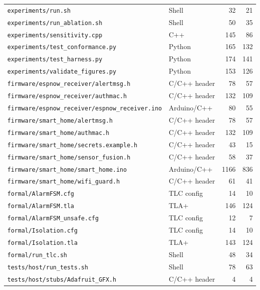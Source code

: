 \begin{longtable}{p{} l r r}
\texttt{\footnotesize experiments/run.sh} & Shell & 32 & 21 \\
\texttt{\footnotesize experiments/run\_ablation.sh} & Shell & 50 & 35 \\
\texttt{\footnotesize experiments/sensitivity.cpp} & C++ & 145 & 86 \\
\texttt{\footnotesize experiments/test\_conformance.py} & Python & 165 & 132 \\
\texttt{\footnotesize experiments/test\_harness.py} & Python & 174 & 141 \\
\texttt{\footnotesize experiments/validate\_figures.py} & Python & 153 & 126 \\
\texttt{\footnotesize firmware/espnow\_receiver/alertmsg.h} & C/C++ header & 78 & 57 \\
\texttt{\footnotesize firmware/espnow\_receiver/authmac.h} & C/C++ header & 132 & 109 \\
\texttt{\footnotesize firmware/espnow\_receiver/espnow\_receiver.ino} & Arduino/C++ & 80 & 55 \\
\texttt{\footnotesize firmware/smart\_home/alertmsg.h} & C/C++ header & 78 & 57 \\
\texttt{\footnotesize firmware/smart\_home/authmac.h} & C/C++ header & 132 & 109 \\
\texttt{\footnotesize firmware/smart\_home/secrets.example.h} & C/C++ header & 43 & 15 \\
\texttt{\footnotesize firmware/smart\_home/sensor\_fusion.h} & C/C++ header & 58 & 37 \\
\texttt{\footnotesize firmware/smart\_home/smart\_home.ino} & Arduino/C++ & 1166 & 836 \\
\texttt{\footnotesize firmware/smart\_home/wifi\_guard.h} & C/C++ header & 61 & 41 \\
\texttt{\footnotesize formal/AlarmFSM.cfg} & TLC config & 14 & 10 \\
\texttt{\footnotesize formal/AlarmFSM.tla} & TLA+ & 146 & 124 \\
\texttt{\footnotesize formal/AlarmFSM\_unsafe.cfg} & TLC config & 12 & 7 \\
\texttt{\footnotesize formal/Isolation.cfg} & TLC config & 14 & 10 \\
\texttt{\footnotesize formal/Isolation.tla} & TLA+ & 143 & 124 \\
\texttt{\footnotesize formal/run\_tlc.sh} & Shell & 48 & 34 \\
\texttt{\footnotesize tests/host/run\_tests.sh} & Shell & 78 & 63 \\
\texttt{\footnotesize tests/host/stubs/Adafruit\_GFX.h} & C/C++ header & 4 & 4 \\

\end{longtable}

